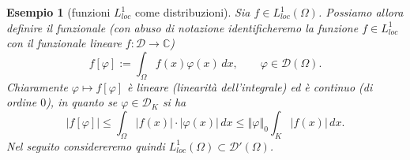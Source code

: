 \documentclass[italian,a4paper,oneside,headinclude]{scrbook}
\renewcommand{\phi}{\varphi}
\newcommand{\loc}{\mathit{loc}}
\newcommand{\D}{\mathcal D}
\newcommand{\CC}{\mathbb C}
\newcommand{\abs}[1]{{\left|#1\right|}}
\newcommand{\Abs}[1]{{\left\Vert #1\right\Vert}}
\newcommand{\defeq}{:=}
\newtheorem{corollary}[theorem]{Corollario}
\newtheorem{example}[theorem]{Esempio}
\begin{document}
\begin{comment}
\begin{corollary}
  Sia $K$ un compatto di $\Omega$. Si ha
  \begin{enumerate}
  \item $\D_K$ è un sottospazio chiuso di $\D(\Omega)$;
  \item $\D_K$ ha parte interna vuota;
  \item $\D(\Omega)$ non è metrizzabile.
  \end{enumerate}
\end{corollary}
%
\begin{proof}
  \begin{enumerate}
  \item
    Si ha
    \[
    \D_K = \{f\in \D(\Omega)\colon f(x)=0\ \forall x \in \Omega\setminus
    K \} = \bigcap_{x\in \Omega\setminus K} \delta_x^{-1}(\{0\}).
    \]
    Visto che $\delta_x$ è continuo, $\delta_x^{-1}$ manda chiusi in
    chiusi e l'intersezione di chiusi è chiusa, si ha il risultato
  \item
    Se un sottospazio vettoriale $V$ di uno svt $X$ contenesse un
    intorno di un punto $x$ allora (traslando) conterrebbe anche un intorno
    di $0$. Allora $V$ sarebbe assorbente.
    Ma i
    riscalamenti di $V$ coincidono con $V$ e dunque si avrebbe
    $V=X$. Cioè nessun sottospazio vettoriale $V\neq X$ di uno svt $X$
    può avere parte interna.
  \item
    Se $K_j$ è una successione di compatti che invade $\Omega$ si ha
    trova che $\D(\Omega)$ è unione dei $\D_{K_j}$ ovvero è unione
    numerabile di chiusi con parte interna vuota.
    Se $\D(\Omega)$
    per assurdo
    fosse metrizzabile sarebbe anche completo (in quanto abbiamo visto
    che $\D(\Omega)$ è completo per successioni) e dunque
    si applicherebbe il Lemma di Baire, che afferma che non è
    possibile che uno spazio metrico completo sia unione numerabile di
    suoi sottoinsiemi chiusi e con parte interna vuota.
    \end{enumerate}
\end{proof}
\end{comment}

\begin{example}[funzioni $L^1_{\loc}$ come distribuzioni]
  Sia $f\in L^1_{\loc}(\Omega)$. Possiamo allora definire il
  funzionale
  (con abuso di notazione identificheremo la funzione $f\in L^1_\loc$
  con il funzionale lineare $f\colon \D \to \CC$)
  \[
  f[\phi] \defeq \int_\Omega f(x)\phi(x)\, dx,
  \qquad \phi \in \D(\Omega).
  \]
  Chiaramente $\phi \mapsto f[\phi]$ è lineare (linearità dell'integrale) ed è continuo
  (di ordine $0$), in quanto se $\phi\in\D_K$ si ha
  \[
  \abs{f[\phi]} \le \int_\Omega\abs{f(x)}\cdot\abs{\phi(x)}\, dx
  \le \Abs{\phi}_0 \int_K \abs{f(x)}\, dx.
  \]
  Nel seguito considereremo quindi $L^1_\loc(\Omega) \subset \D'(\Omega)$.
\end{example}
\end{document}
